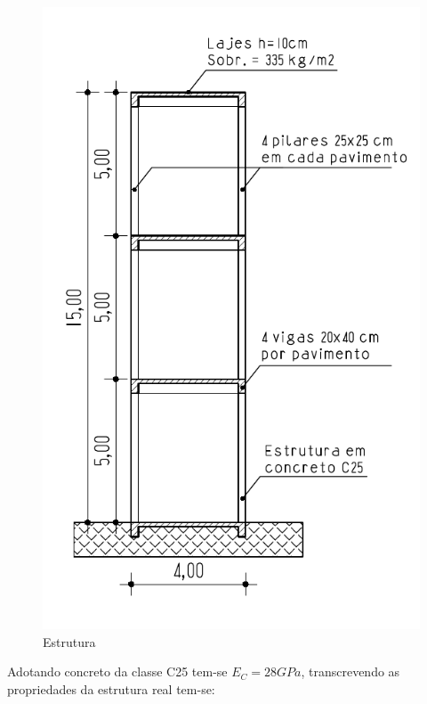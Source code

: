 \begin{figure}
\centering
\includegraphics[scale=0.7]{../images/estrutura}
\caption{Estrutura}
\end{figure}

Adotando concreto da classe C25 tem-se \(E_C=28GPa\), transcrevendo as
propriedades da estrutura real tem-se:

